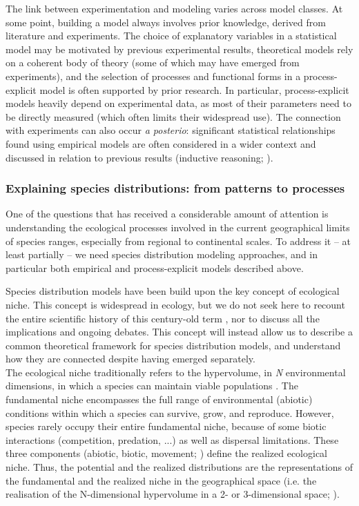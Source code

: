 The link between experimentation and modeling varies across model classes. At some point, building a model always involves prior knowledge, derived from literature and experiments. The choice of explanatory variables in a statistical model may be motivated by previous experimental results, theoretical models rely on a coherent body of theory (some of which may have emerged from experiments), and the selection of processes and functional forms in a process-explicit model is often supported by prior research. In particular, process-explicit models heavily depend on experimental data, as most of their parameters need to be directly measured (which often limits their widespread use). The connection with experiments can also occur \emph{a posterio}: significant statistical relationships found using empirical models are often considered in a wider context  and discussed in relation to previous results (inductive reasoning; \citealp{Davi2012}).

\subsubsection{Explaining species distributions: from patterns to processes} \label{sec:approach}

One of the questions that has received a considerable amount of attention is understanding the ecological processes involved in the current geographical limits of species ranges, especially from regional to continental scales. To address it -- at least partially -- we need species distribution modeling approaches, and in particular both empirical and process-explicit models described above.

Species distribution models have been build upon the key concept of ecological niche. This concept is widespread in ecology, but we do not seek here to recount the entire scientific history of this century-old term \citep{Grinnell1917}, nor to discuss all the implications and ongoing debates. This concept will instead allow us to describe a common theoretical framework for species distribution models, and understand how they are connected despite having emerged separately.\\
The ecological niche traditionally refers to the hypervolume, in \textit{N} environmental dimensions, in which a species can maintain viable populations \citep{Hutchinson1957}. 
The fundamental niche encompasses the full range of environmental (abiotic) conditions within which a species can survive, grow, and reproduce. However, species rarely occupy their entire fundamental niche, because of some biotic interactions (competition, predation, ...) as well as dispersal limitations. These three components (abiotic, biotic, movement; \citealp{Soberon2005}) define the realized ecological niche. Thus, the potential and the realized distributions are the representations of the fundamental and the realized niche in the geographical space (i.e. the realisation of the N-dimensional hypervolume in a 2- or 3-dimensional space; ). 

